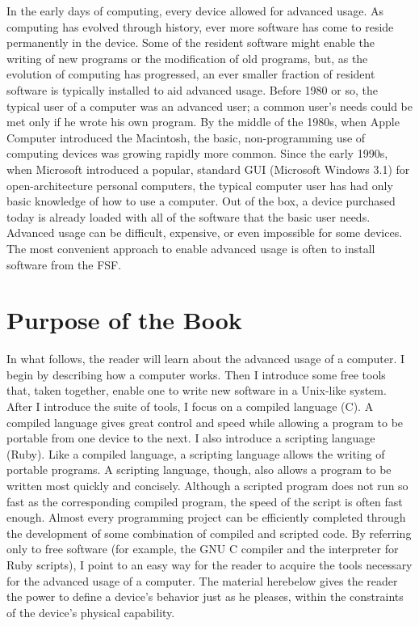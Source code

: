 \documentclass[twocolumn]{book}
\begin{document}
In the early days of computing, every device allowed for advanced usage.  As
computing has evolved through history, ever more software has come to reside
permanently in the device.  Some of the resident software might enable the
writing of new programs or the modification of old programs, but, as the
evolution of computing has progressed, an ever smaller fraction of resident
software is typically installed to aid advanced usage.  Before 1980 or so, the
typical user of a computer was an advanced user; a common user's needs could be
met only if he wrote his own program.  By the middle of the 1980s, when Apple
Computer introduced the Macintosh, the basic, non-programming use of computing
devices was growing rapidly more common.  Since the early 1990s, when Microsoft
introduced a popular, standard GUI (Microsoft Windows 3.1) for
open-architecture personal computers, the typical computer user has had only
basic knowledge of how to use a computer.  Out of the box, a device purchased
today is already loaded with all of the software that the basic user needs.
Advanced usage can be difficult, expensive, or even impossible for some
devices.  The most convenient approach to enable advanced usage is often to
install software from the FSF.

\section{Purpose of the Book}

In what follows, the reader will learn about the advanced usage of a computer.
I begin by describing how a computer works.  Then I introduce some free tools
that, taken together, enable one to write new software in a Unix-like system.
After I introduce the suite of tools, I focus on a compiled language (C).  A
compiled language gives great control and speed while allowing a program to be
portable from one device to the next.  I also introduce a scripting language
(Ruby).  Like a compiled language, a scripting language allows the writing of
portable programs.  A scripting language, though, also allows a program to be
written most quickly and concisely.  Although a scripted program does not run
so fast as the corresponding compiled program, the speed of the script is often
fast enough.  Almost every programming project can be efficiently completed
through the development of some combination of compiled and scripted code.  By
referring only to free software (for example, the GNU C compiler and the
interpreter for Ruby scripts), I point to an easy way for the reader to acquire
the tools necessary for the advanced usage of a computer.  The material
herebelow gives the reader the power to define a device's behavior just as he
pleases, within the constraints of the device's physical capability.
\end{document}
